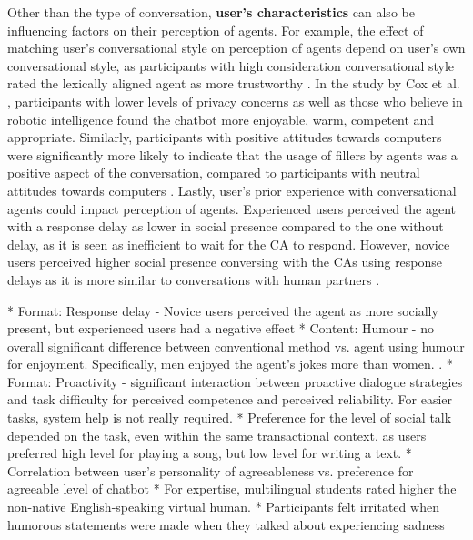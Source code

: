 \documentclass[sigconf,screen,review, anonymous]{acmart}
\newcommand{\cmt}[1]{}%
\begin{document}
Other than the type of conversation, \textbf{user's characteristics} can also be influencing factors on their perception of agents. For example, the effect of matching user's conversational style on perception of agents depend on user's own conversational style, as participants with high consideration conversational style rated the lexically aligned agent as more trustworthy \cite{hoegen2019end}\cmt{[31]}. In the study by Cox et al. \cite{cox2022does}\cmt{[27]}, participants with lower levels of privacy concerns as well as those who believe in robotic intelligence found the chatbot more enjoyable, warm, competent and appropriate. Similarly, participants with positive attitudes towards computers were significantly more likely to indicate that the usage of fillers by agents was a positive aspect of the conversation, compared to participants with neutral attitudes towards computers \cite{pfeifer2009should}\cmt{[12]}. Lastly, user's prior experience with conversational agents could impact perception of agents. Experienced users perceived the agent with a response delay as lower in social presence compared to the one without delay, as it is seen as inefficient to wait for the CA to respond. However, novice users perceived higher social presence conversing with the CAs using response delays as it is more similar to conversations with human partners \cite{gnewuch2018faster}\cmt{[19]}.

* Format: Response delay - Novice users perceived the agent as more socially present, but experienced users had a negative effect \cite{gnewuch2022opposing}\cmt{[20]}
* Content: Humour - no overall significant difference between conventional method vs. agent using humour for enjoyment. Specifically, men enjoyed the agent's jokes more than women.  \cite{miyamoto2017improving}\cmt{[46]}.
* Format: Proactivity - significant interaction between proactive dialogue strategies and task difficulty for perceived competence and perceived reliability. For easier tasks, system help is not really required. \cite{kraus2020effects}\cmt{[64]}
* Preference for the level of social talk depended on the task, even within the same transactional context, as users preferred high level for playing a song, but low level for writing a text. \cite{volkel2021manipulating}\cmt{[68]}
* Correlation between user's personality of agreeableness vs. preference for agreeable level of chatbot \cite{volkel2021examining}\cmt{[69]}
* For expertise, multilingual students rated higher the non-native English-speaking virtual human. \cite{feijoo2021effects}\cmt{[70]}
* Participants felt irritated when humorous statements were made when they talked about experiencing sadness \cite{go2021conversational}\cmt{[80]}
\end{document}
